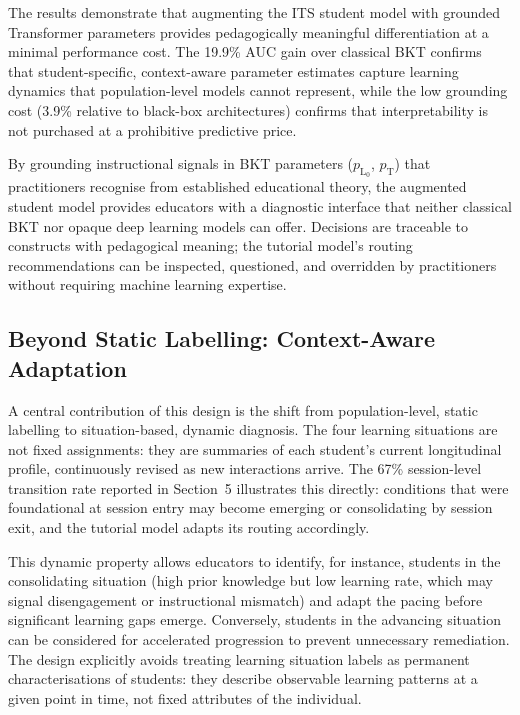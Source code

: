 \documentclass[runningheads]{llncs}
\begin{document}
The results demonstrate that augmenting the ITS student model with grounded Transformer parameters provides pedagogically meaningful differentiation at a minimal performance cost. The 19.9\% AUC gain over classical BKT confirms that student-specific, context-aware parameter estimates capture learning dynamics that population-level models cannot represent, while the low grounding cost (3.9\% relative to black-box architectures) confirms that interpretability is not purchased at a prohibitive predictive price.

By grounding instructional signals in BKT parameters ($p_{\text{L}_0}$, $p_{\text{T}}$) that practitioners recognise from established educational theory, the augmented student model provides educators with a diagnostic interface that neither classical BKT nor opaque deep learning models can offer. Decisions are traceable to constructs with pedagogical meaning; the tutorial model's routing recommendations can be inspected, questioned, and overridden by practitioners without requiring machine learning expertise.

\subsection{Beyond Static Labelling: Context-Aware Adaptation}

A central contribution of this design is the shift from population-level, static labelling to situation-based, dynamic diagnosis. The four learning situations are not fixed assignments: they are summaries of each student's current longitudinal profile, continuously revised as new interactions arrive. The 67\% session-level transition rate reported in Section~5 illustrates this directly: conditions that were foundational at session entry may become emerging or consolidating by session exit, and the tutorial model adapts its routing accordingly.

This dynamic property allows educators to identify, for instance, students in the consolidating situation (high prior knowledge but low learning rate, which may signal disengagement or instructional mismatch) and adapt the pacing before significant learning gaps emerge. Conversely, students in the advancing situation can be considered for accelerated progression to prevent unnecessary remediation. The design explicitly avoids treating learning situation labels as permanent characterisations of students: they describe observable learning patterns at a given point in time, not fixed attributes of the individual.
\end{document}
